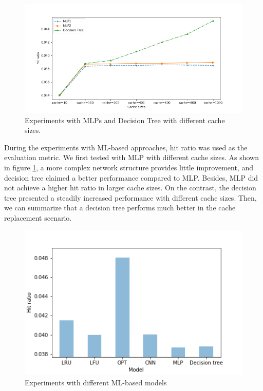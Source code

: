 \documentclass[letterpaper,twocolumn,10pt]{article}
\begin{document}
\begin{figure}[!ht]
	\centering 
	\includegraphics[width=0.38\textheight]{NN_hit.png}
	\caption{ Experiments with MLPs and Decision Tree with different cache sizes.
}
	\label{fig:nn_hit}
\end{figure}

During the experiments with ML-based approaches, hit ratio was used as the evaluation metric. We first tested with MLP with different cache sizes. As shown in figure \ref{fig:nn_hit}, a more complex network structure provides little improvement, and decision tree claimed a better performance compared to MLP. Besides, MLP did not achieve a higher hit ratio in larger cache sizes. On the contrast, the decision tree presented a steadily increased performance with different cache sizes. Then, we can summarize that a decision tree performs much better in the cache replacement scenario.

\begin{figure}[!ht]
	\centering 
	\includegraphics[width=0.38\textheight]{CNN_DNN_DT.png}
	\caption{Experiments with different ML-based models
}
	\label{fig:cnn_dnn_dt}
\end{figure}
\end{document}
